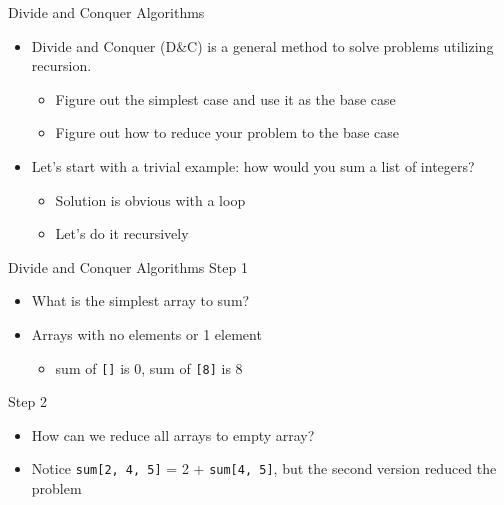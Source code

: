 \documentclass[
  ignorenonframetext,
]{beamer}
\providecommand{\tightlist}{%
  \setlength{\itemsep}{0pt}\setlength{\parskip}{0pt}}\usepackage{longtable,booktabs,array}
\begin{document}
\begin{frame}{Divide and Conquer Algorithms}
\protect\hypertarget{divide-and-conquer-algorithms}{}
\begin{itemize}
\item
  Divide and Conquer (D\&C) is a general method to solve problems
  utilizing recursion.

  \begin{itemize}
  \item
    Figure out the simplest case and use it as the base case
  \item
    Figure out how to reduce your problem to the base case
  \end{itemize}
\item
  Let's start with a trivial example: how would you sum a list of
  integers?

  \begin{itemize}
  \item
    Solution is obvious with a loop
  \item
    Let's do it recursively
  \end{itemize}
\end{itemize}
\end{frame}

\begin{frame}[fragile]{Divide and Conquer Algorithms}
\protect\hypertarget{divide-and-conquer-algorithms-1}{}
Step 1

\begin{itemize}
\item
  What is the simplest array to sum?
\item
  Arrays with no elements or 1 element

  \begin{itemize}
  \tightlist
  \item
    sum of \texttt{{[}{]}} is 0, sum of \texttt{{[}8{]}} is 8
  \end{itemize}
\end{itemize}

Step 2

\begin{itemize}
\item
  How can we reduce all arrays to empty array?
\item
  Notice \texttt{sum{[}2,\ 4,\ 5{]}} = 2 + \texttt{sum{[}4,\ 5{]}}, but
  the second version reduced the problem
\end{itemize}
\end{frame}
\end{document}

